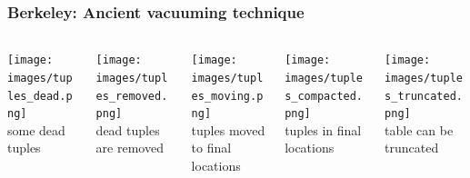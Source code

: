 \begin{frame}
  \frametitle{Berkeley: Ancient vacuuming technique}
  \begin{columns}
    \begin{column}{0.20\textwidth}
      \texttt{[image: images/tuples\_dead.png]} \\
      some dead tuples
    \end{column}
    \begin{column}{0.20\textwidth}
      \texttt{[image: images/tuples\_removed.png]} \\
      dead tuples are removed
    \end{column}
    \begin{column}{0.20\textwidth}
      \texttt{[image: images/tuples\_moving.png]} \\
      tuples moved to final locations
    \end{column}
    \begin{column}{0.20\textwidth}
      \texttt{[image: images/tuples\_compacted.png]} \\
      tuples in final locations
    \end{column}
    \begin{column}{0.20\textwidth}
      \texttt{[image: images/tuples\_truncated.png]} \\
      table can be truncated
    \end{column}

  \end{columns}
\end{frame}


